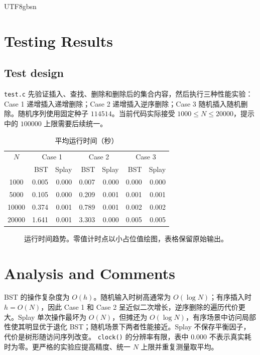 \documentclass{article}
\begin{document}
\begin{CJK*}{UTF8}{gbsn}
\section{Testing Results}
\subsection{Test design}
\texttt{test.c} 先验证插入、查找、删除和删除后的集合内容，然后执行三种性能实验：Case 1 递增插入递增删除；Case 2 递增插入逆序删除；Case 3 随机插入随机删除。随机序列使用固定种子 $114514$。当前代码实际接受 $1000\leq N\leq20000$，提示中的 $100000$ 上限需要后续统一。
\begin{table}[ht]\centering\caption{平均运行时间（秒）}\label{tab:runtime}
\begin{tabular}{crrrrrr}\toprule
$N$&\multicolumn{2}{c}{Case 1}&\multicolumn{2}{c}{Case 2}&\multicolumn{2}{c}{Case 3}\\
&BST&Splay&BST&Splay&BST&Splay\\\midrule
1000&0.005&0.000&0.007&0.000&0.000&0.000\\
5000&0.105&0.000&0.209&0.001&0.001&0.001\\
10000&0.374&0.001&0.789&0.001&0.002&0.002\\
20000&1.641&0.001&3.303&0.000&0.005&0.005\\\bottomrule
\end{tabular}\end{table}
\begin{figure}[ht]\centering{}\caption{运行时间趋势。零值计时点以小占位值绘图，表格保留原始输出。}\end{figure}
\section{Analysis and Comments}
BST 的操作复杂度为 $O(h)$。随机输入时树高通常为 $O(\log N)$；有序插入时 $h=O(N)$，因此 Case 1 和 Case 2 呈近似二次增长，逆序删除的遍历代价更大。Splay 单次操作最坏为 $O(N)$，但摊还为 $O(\log N)$，有序场景中访问局部性使其明显优于退化 BST；随机场景下两者性能接近。Splay 不保存平衡因子，代价是树形随访问序列改变。
\texttt{clock()} 的分辨率有限，表中 $0.000$ 不表示真实耗时为零。更严格的实验应提高精度、统一 $N$ 上限并重复测量取平均。

\end{CJK*}
\end{document}
